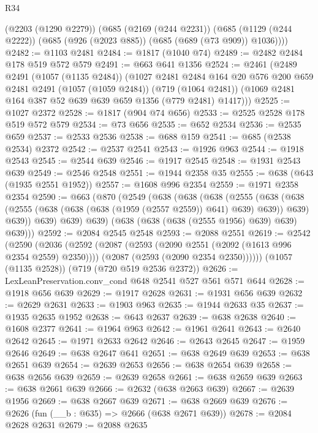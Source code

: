 \begin{lexlean}{R34}
\begin{coremodule}
    (@2203 (@1290 @2279))
    (@685
      (@2169 (@244 @2231))
      (@685 (@1129 (@244 @2222)) (@685 (@926 (@2023 @885)) (@685 (@689 (@73 @909)) @1036))))
@2482 := @1103 @2481
@2484 := @1817 (@1040 @74)
@2489 := @2482 @2484 @178 @519 @572 @579
@2491 := @663 @641 @1356
@2524 := @2461
    (@2489
      @2491
      (@1057 (@1135 @2484))
      (@1027
        @2481
        @2484
        @164
        @20
        @576
        @200
        @659
        @2481
        @2491
        (@1057 (@1059 @2484))
        (@719 (@1064 @2481))
        (@1069 @2481 @164 @387 @52 @639 @639 @659 @1356 (@779 @2481) @1417)))
@2525 := @1027 @2372
@2528 := @1817 (@904 @74 @656)
@2533 := @2525 @2528 @178 @519 @572 @579
@2534 := @73 @656
@2535 := @652 @2534
@2536 := @2535 @659
@2537 := @2533 @2536
@2538 := @688 @159
@2541 := @685 (@2538 @2534) @2372
@2542 := @2537 @2541
@2543 := @1926 @963
@2544 := @1918 @2543
@2545 := @2544 @639
@2546 := @1917 @2545
@2548 := @1931 @2543 @639
@2549 := @2546 @2548
@2551 := @1944 @2358 @35
@2555 := @638 (@643 (@1935 @2551 @1952))
@2557 := @1608 @996 @2354
@2559 := @1971 @2358 @2354
@2590 := @663
    (@870
      (@2549
        (@638
          (@638
            (@638
              (@2555
                (@638
                  (@638 (@2555 (@638 (@638 (@638 (@1959 (@2557 @2559)) @641) @639) @639)) @639)
                  @639))
              @639)
            @639)
          @639)
        (@638 (@638 (@638 (@2555 @1956) @639) @639) @639)))
@2592 := @2084 @2545 @2548
@2593 := @2088 @2551
@2619 := @2542
    (@2590
      (@2036
        (@2592
          (@2087 (@2593 (@2090 @2551 (@2092 (@1613 @996 @2354 @2559) @2350))))
          (@2087 (@2593 (@2090 @2354 @2350))))))
    (@1057 (@1135 @2528))
    (@719 (@720 @519 @2536 @2372))
@2626 := LexLeanPreservation.conv_cond @648 @2541 @527 @561 @571 @644
@2628 := @1918 @656 @639
@2629 := @1917 @2628
@2631 := @1931 @656 @639
@2632 := @2629 @2631
@2633 := @1903 @963
@2635 := @1944 @2633 @35
@2637 := @1935 @2635 @1952
@2638 := @643 @2637
@2639 := @638 @2638
@2640 := @1608 @2377
@2641 := @1964 @963
@2642 := @1961 @2641
@2643 := @2640 @2642
@2645 := @1971 @2633 @2642
@2646 := @2643 @2645
@2647 := @1959 @2646
@2649 := @638 @2647 @641
@2651 := @638 @2649 @639
@2653 := @638 @2651 @639
@2654 := @2639 @2653
@2656 := @638 @2654 @639
@2658 := @638 @2656 @639
@2659 := @2639 @2658
@2661 := @638 @2659 @639
@2663 := @638 @2661 @639
@2666 := @2632 (@638 @2663 @639)
@2667 := @2639 @1956
@2669 := @638 @2667 @639
@2671 := @638 @2669 @639
@2676 := @2626 (fun (__b : @635) => @2666 (@638 @2671 @639))
@2678 := @2084 @2628 @2631
@2679 := @2088 @2635

\end{coremodule}
\end{lexlean}
